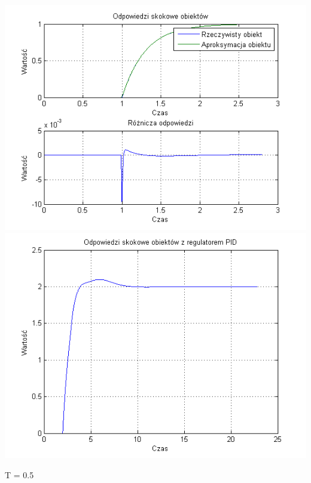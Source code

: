 \documentclass[10pt,a4paper]{article}
\begin{document}
\begin{center}
\includegraphics[scale=1]{images/dwa/skrypt_09.png}\\
\includegraphics[scale=1]{images/dwa/skrypt_10.png}\\
\end{center}
\newpage
T = 0.5
\end{document}
